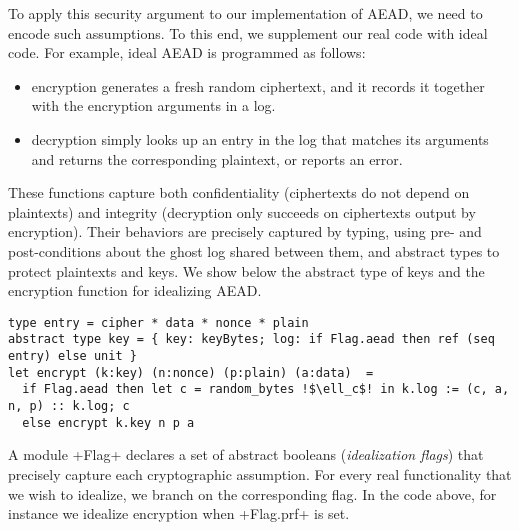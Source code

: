 To apply this security argument to our implementation of AEAD, we need
to encode such assumptions.  To this end, we supplement our real
\lowstar code with ideal \fstar code.
%
%
For example, ideal AEAD is programmed as follows:
\begin{itemize}
\item encryption generates a fresh random ciphertext, and it records
  it together with the encryption arguments in a log.

\item decryption simply looks up an entry in the log that matches its
  arguments and returns the corresponding plaintext, or reports an
  error.
\end{itemize}
These functions capture both confidentiality (ciphertexts do not
depend on plaintexts) and integrity (decryption only succeeds on
ciphertexts output by encryption).
%
Their behaviors are precisely captured by typing, using pre- and
post-conditions about the ghost log shared between them, and
abstract types to protect plaintexts and keys.
%
%
%
%
We show below the abstract type of keys and the encryption function for
idealizing AEAD.
\begin{lstlisting}[numbers=none]
type entry = cipher * data * nonce * plain
abstract type key = { key: keyBytes; log: if Flag.aead then ref (seq entry) else unit }
let encrypt (k:key) (n:nonce) (p:plain) (a:data)  =
  if Flag.aead then let c = random_bytes !$\ell_c$! in k.log := (c, a, n, p) :: k.log; c
  else encrypt k.key n p a
\end{lstlisting}

A module \li+Flag+ declares a set of abstract booleans (\emph{idealization
flags}) that precisely capture each cryptographic assumption.
%
For every real functionality that we wish to idealize, we branch on
the corresponding flag. In the code above, for instance we idealize
encryption when \li+Flag.prf+ is set.
%
%
%

